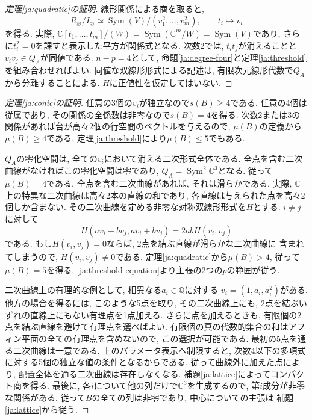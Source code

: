 \documentclass[12pt]{amsart}
\theoremstyle{definition}
\theoremstyle{remark}
\numberwithin{equation}{section}
\DeclareMathOperator{\Sym}{Sym}
\newcommand{\C}{\mathbb{C}}
\newcommand{\Q}{\mathbb{Q}}
\begin{document}
\begin{proof}[定理\ref{ja:quadratic}の証明]
線形関係による商を取ると,
\begin{equation}\label{ja:quotient}
 R_{\varnothing}/I_{\varnothing}
 \simeq \Sym(V)/(v_1^2,\ldots,v_m^2),\qquad t_i\longmapsto v_i
\end{equation}
を得る. 実際,
$\C[t_1,\ldots,t_m]/(W)=\Sym(\C^m/W)=\Sym(V)$であり,
さらに$t_i^2=0$を課すと表示した平方が関係式となる.
次数2では, $t_i t_j$が消えることと$v_i v_j\in Q_A$が同値である.
$n-p=4$として, 命題\ref{ja:degree-four}と定理\ref{ja:threshold}を組み合わせればよい.
同値な双線形形式による記述は, 有限次元線形代数で$Q_A$から分離することによる.
$H$に正値性を仮定してはいない.
\end{proof}

\begin{proof}[定理\ref{ja:conic}の証明]
任意の3個の$v_i$が独立なので$s(B)\geq4$である.
任意の4個は従属であり, その関係の全係数は非零なので$s(B)=4$を得る.
次数2または3の関係があれば台が高々2個の行空間のベクトルを与えるので,
$\mu(B)$の定義から$\mu(B)\geq4$である.
定理\ref{ja:threshold}により$\mu(B)\leq5$でもある.

$Q_A$の零化空間は, 全ての$v_i$において消える二次形式全体である.
全点を含む二次曲線がなければこの零化空間は零であり,
$Q_A=\Sym^2\C^3$となる. 従って$\mu(B)=4$である.
全点を含む二次曲線があれば, それは滑らかである.
実際, $\C$上の特異な二次曲線は高々2本の直線の和であり,
各直線は与えられた点を高々2個しか含まない.
その二次曲線を定める非零な対称双線形形式を$H$とする.
$i\ne j$に対して
\[
 H(av_i+bv_j,av_i+bv_j)=2abH(v_i,v_j)
\]
である. もし$H(v_i,v_j)=0$ならば, 2点を結ぶ直線が滑らかな二次曲線に
含まれてしまうので, $H(v_i,v_j)\ne0$である.
定理\ref{ja:quadratic}から$\mu(B)>4$, 従って$\mu(B)=5$を得る.
\eqref{ja:threshold-equation}より主張の2つの$p$の範囲が従う.

二次曲線上の有理的な例として, 相異なる$a_i\in\Q$に対する
$v_i=(1,a_i,a_i^2)$がある.
他方の場合を得るには, このような5点を取り, その二次曲線上にも,
2点を結ぶいずれの直線上にもない有理点を1点加える.
さらに点を加えるときも, 有限個の2点を結ぶ直線を避けて有理点を選べばよい.
有限個の真の代数的集合の和はアフィン平面の全ての有理点を含めないので,
この選択が可能である.
最初の5点を通る二次曲線は一意である. 上のパラメータ表示へ制限すると,
次数4以下の多項式に対する5個の独立な値の条件となるからである.
従って曲線外に加えた点により, 配置全体を通る二次曲線は存在しなくなる.
補題\ref{ja:lattice}によってコンパクト商を得る.
最後に, 各$i$について他の列だけで$\C^3$を生成するので,
第$i$成分が非零な関係がある.
従って$B$の全ての列は非零であり, 中心についての主張は
補題\ref{ja:lattice}から従う.
\end{proof}
\end{document}
